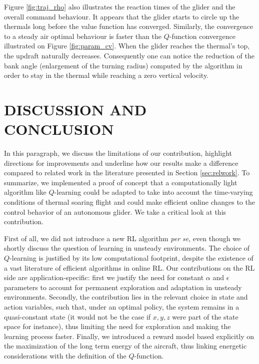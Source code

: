 \documentclass[a4paper, 10pt, conference]{ieeeconf}
\begin{document}
Figure \ref{fig:traj_rho} also illustrates the reaction times of the glider and the overall command behaviour. It appears that the glider starts to circle up the thermals long before the value function has converged. Similarly, the convergence to a steady air optimal behaviour is faster than the $Q$-function convergence illustrated on Figure \ref{fig:param_cv}.
When the glider reaches the thermal's top, the updraft naturally decreases. Consequently one can notice the reduction of the bank angle (enlargement of the turning radius) computed by the algorithm in order to stay in the thermal while reaching a zero vertical velocity.


\section{DISCUSSION AND CONCLUSION}
\label{sec:conclu}

In this paragraph, we discuss the limitations of our contribution, highlight directions for improvements and underline how our results make a difference compared to related work in the literature presented in Section \ref{sec:relwork}. To summarize, we implemented a proof of concept that a computationally light algorithm like $Q$-learning could be adapted to take into account the time-varying conditions of thermal soaring flight and could make efficient online changes to the control behavior of an autonomous glider. We take a critical look at this contribution.

First of all, we did not introduce a new RL algorithm \emph{per se}, even though we shortly discuss the question of learning in unsteady environments. The choice of $Q$-learning is justified by its low computational footprint, despite the existence of a vast literature of efficient algorithms in online RL. Our contributions on the RL side are application-specific: first we justify the need for constant $\alpha$ and $\epsilon$ parameters to account for permanent exploration and adaptation in unsteady environments. Secondly, the contribution lies in the relevant choice in state and action variables, such that, under an optimal policy, the system remains in a quasi-constant state (it would not be the case if $x,y,z$ were part of the state space for instance), thus limiting the need for exploration and making the learning process faster. Finally, we introduced a reward model based explicitly on the maximization of the long term energy of the aircraft, thus linking energetic considerations with the definition of the $Q$-function.
\end{document}
